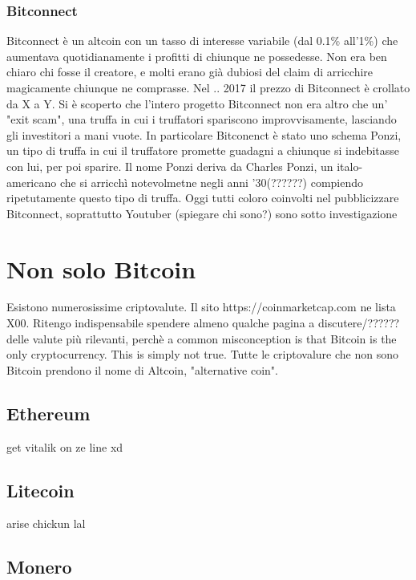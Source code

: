 \documentclass {article}
\begin{document}
\subsubsection {Bitconnect}


Bitconnect è un altcoin con un tasso di interesse variabile (dal 0.1\% all'1\%) che aumentava quotidianamente i profitti di chiunque ne possedesse.
Non era ben chiaro chi fosse il creatore, e molti erano già dubiosi del claim di arricchire magicamente chiunque ne comprasse.
Nel .. 2017 il prezzo di Bitconnect è crollato da X a Y. Si è scoperto che l'intero progetto Bitconnect non era altro che un' "exit scam", una truffa in cui i truffatori spariscono improvvisamente, lasciando gli investitori a mani vuote.
In particolare Bitconenct è stato uno schema Ponzi, un tipo di truffa in cui il truffatore promette guadagni a chiunque si indebitasse con lui, per poi sparire.
Il nome Ponzi deriva da Charles Ponzi, un italo-americano che si arricchì notevolmetne negli anni '30(??????) compiendo ripetutamente questo tipo di truffa.
Oggi tutti coloro coinvolti nel pubblicizzare Bitconnect, soprattutto Youtuber (spiegare chi sono?) sono sotto investigazione


\section {Non solo Bitcoin}


Esistono numerosissime criptovalute. Il sito https://coinmarketcap.com ne lista X00. Ritengo indispensabile spendere almeno qualche pagina a discutere/?????? delle valute più rilevanti, perchè a common misconception is that Bitcoin is the only cryptocurrency. This is simply not true. Tutte le criptovalure che non sono Bitcoin prendono il nome di Altcoin, "alternative coin".


\subsection {Ethereum}


get vitalik on ze line xd


\subsection {Litecoin}


arise chickun lal


\subsection {Monero}
\end{document}
